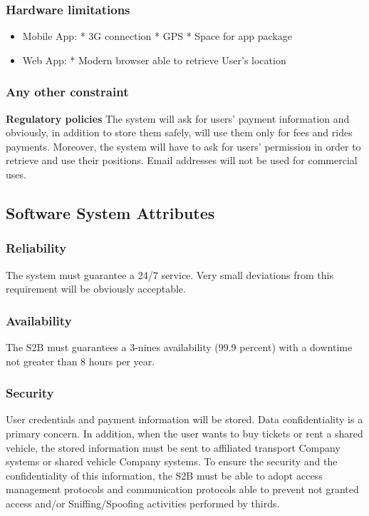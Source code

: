 	\subsubsection{Hardware limitations}
		\begin{itemize}
		\item Mobile App: \newline
			* 3G connection\newline
			* GPS\newline
			* Space for app package
		\item Web App: \newline
			* Modern browser able to retrieve User's location
		\end{itemize}
	
	\subsubsection{Any other constraint}
\textbf{Regulatory policies}\newline
	The system will ask for users' payment information and obviously, in addition to store them
	safely, will use them only for fees and rides payments.
	Moreover, the system will have to ask for users' permission in order to retrieve and use their
	positions.
	Email addresses will not be used for commercial uses.
\subsection{Software System Attributes} 
	\subsubsection{Reliability}
	The system must guarantee a 24/7 service. Very small deviations from this requirement will be
	obviously acceptable.
	\subsubsection{Availability}
	The S2B must guarantees a 3-nines availability (99.9 percent) with a downtime not greater than 8 hours per year.
	\subsubsection{Security}
User credentials and payment information will be stored. Data confidentiality is a primary concern.
In addition, when the user wants to buy tickets or rent a shared vehicle, the stored information must be sent to affiliated  transport Company systems or shared vehicle Company  systems. To ensure the security and the confidentiality of this information, the S2B must be able to adopt  access management protocols and communication protocols able to prevent not granted access and/or Sniffing/Spoofing activities performed by thirds.
	
